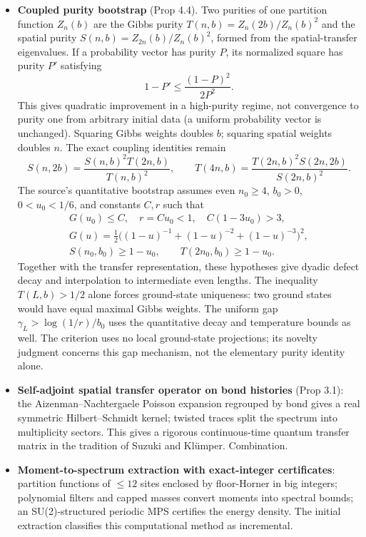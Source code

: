 \documentclass[11pt]{article}
\begin{document}
\begin{itemize}
\item \textbf{Coupled purity bootstrap} (Prop 4.4). Two purities of one partition function $Z_n(b)$ are the Gibbs purity $T(n,b)=Z_n(2b)/Z_n(b)^2$ and the spatial purity $S(n,b)=Z_{2n}(b)/Z_n(b)^2$, formed from the spatial-transfer eigenvalues. If a probability vector has purity $P$, its normalized square has purity $P'$ satisfying
\[
 1-P'\le\frac{(1-P)^2}{2P^2}.
\]
This gives quadratic improvement in a high-purity regime, not convergence to purity one from arbitrary initial data (a uniform probability vector is unchanged). Squaring Gibbs weights doubles $b$; squaring spatial weights doubles $n$. The exact coupling identities remain
\[
 S(n,2b)=\frac{S(n,b)^2T(2n,b)}{T(n,b)^2},\qquad
 T(4n,b)=\frac{T(2n,b)^2S(2n,2b)}{S(2n,b)^2}.
\]
The source's quantitative bootstrap assumes even $n_0\ge4$, $b_0>0$, $0<u_0<1/6$, and constants $C,r$ such that
\[
\begin{gathered}
 G(u_0)\le C,\quad r=Cu_0<1,\quad C(1-3u_0)>3,\\
 G(u)=\tfrac12\bigl((1-u)^{-1}+(1-u)^{-2}+(1-u)^{-3}\bigr)^2,\\
 S(n_0,b_0)\ge1-u_0,\qquad T(2n_0,b_0)\ge1-u_0.
\end{gathered}
\]
Together with the transfer representation, these hypotheses give dyadic defect decay and interpolation to intermediate even lengths. The inequality $T(L,b)>1/2$ alone forces ground-state uniqueness: two ground states would have equal maximal Gibbs weights. The uniform gap $\gamma_L>\log(1/r)/b_0$ uses the quantitative decay and temperature bounds as well. The criterion uses no local ground-state projections; its novelty judgment concerns this gap mechanism, not the elementary purity identity alone.
\item \textbf{Self-adjoint spatial transfer operator on bond histories} (Prop 3.1): the Aizenman--Nachtergaele Poisson expansion regrouped by bond gives a real symmetric Hilbert--Schmidt kernel; twisted traces split the spectrum into multiplicity sectors. This gives a rigorous continuous-time quantum transfer matrix in the tradition of Suzuki and Klümper. Combination.
\item \textbf{Moment-to-spectrum extraction with exact-integer certificates}: partition functions of $\le 12$ sites enclosed by floor-Horner in big integers; polynomial filters and capped masses convert moments into spectral bounds; an SU(2)-structured periodic MPS certifies the energy density. The initial extraction classifies this computational method as incremental.
\end{itemize}
\end{document}
